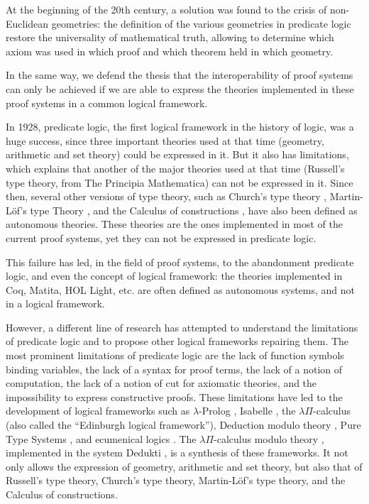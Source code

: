At the beginning of the 20th century, a solution was found to the
crisis of non-Euclidean geometries: the definition of the various
geometries in predicate logic \cite{HilbertAckermann} restore the
universality of mathematical truth, allowing to determine which axiom
was used in which proof and which theorem held in which geometry.

In the same way, we defend the thesis that the interoperability of
proof systems can only be achieved if we are able to express the
theories implemented in these proof systems in a common logical
framework.

In 1928, predicate logic, the first logical framework in the history
of logic, was a huge success, since three important theories used at
that time (geometry, arithmetic and set theory) could be expressed in
it. But it also has limitations, which explains that another of the
major theories used at that time (Russell's type theory, from The
Principia Mathematica) can not be expressed in it. Since then, several
other versions of type theory, such as Church's type theory
\cite{Church40}, Martin-L\"of's type Theory \cite{Martin-Lof84}, and
the Calculus of constructions \cite{CoquandHuet88}, have also been
defined as autonomous theories. These theories are the ones
implemented in most of the current proof systems, yet they can not be
expressed in predicate logic.

This failure has led, in the field of proof systems, to the
abandonment predicate logic, and even the concept of logical
framework: the theories implemented in {\sc Coq}, {\sc Matita}, {\sc
  HOL Light}, etc. are often defined as autonomous systems, and not in
a logical framework.

However, a different line of research has attempted to understand the
limitations of predicate logic and to propose other logical frameworks
repairing them. The most prominent limitations of predicate logic are
the lack of function symbols binding variables, the lack of a syntax
for proof terms, the lack of a notion of computation, the lack of a
notion of cut for axiomatic theories, and the impossibility to express
constructive proofs. These limitations have led to the development of
logical frameworks such as $\lambda$-Prolog \cite{NadathurMiller88,
  MillerNadathur12}, Isabelle \cite{Paulson90}, the $\lambda
\Pi$-calculus \cite{HarperHonsellPlotkin91} (also called the
``Edinburgh logical framework''), Deduction modulo theory
\cite{DowekHardinKirchner03, DowekWerner03}, Pure Type Systems
\cite{Berardi88,Terlouw89}, and ecumenical logics
\cite{Prawitz15,Dowek15,PereiraRodriguez17}. The $\lambda
\Pi$-calculus modulo theory \cite{CousineauDowek07}, implemented in
the system {\sc Dedukti} \cite{Assaf16}, is a synthesis of these
frameworks. It not only allows the expression of geometry, arithmetic
and set theory, but also that of Russell's type theory, Church's type
theory, Martin-L\"of's type theory, and the Calculus of constructions.


